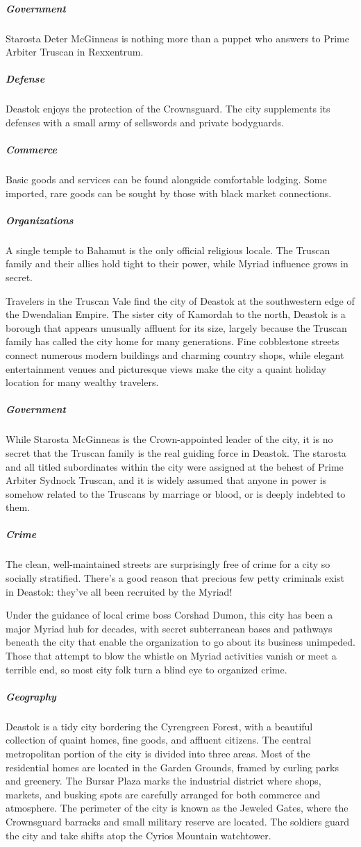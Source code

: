 \documentclass[10pt,a4paper,twoside,bg=print,twocolumn,openany,nodeprecatedcode]{dndbook}
\begin{document}
\subparagraph{Government}
Starosta Deter McGinneas is nothing more than a puppet who answers to Prime Arbiter Truscan in Rexxentrum.

\subparagraph{Defense}
Deastok enjoys the protection of the Crownsguard. The city supplements its defenses with a small army of sellswords and private bodyguards.

\subparagraph{Commerce}
Basic goods and services can be found alongside comfortable lodging. Some imported, rare goods can be sought by those with black market connections.

\subparagraph{Organizations}
A single temple to Bahamut is the only official religious locale. The Truscan family and their allies hold tight to their power, while Myriad influence grows in secret.

Travelers in the Truscan Vale find the city of Deastok at the southwestern edge of the Dwendalian Empire. The sister city of Kamordah to the north, Deastok is a borough that appears unusually affluent for its size, largely because the Truscan family has called the city home for many generations. Fine cobblestone streets connect numerous modern buildings and charming country shops, while elegant entertainment venues and picturesque views make the city a quaint holiday location for many wealthy travelers.

\subparagraph{Government}
While Starosta McGinneas is the Crown-appointed leader of the city, it is no secret that the Truscan family is the real guiding force in Deastok. The starosta and all titled subordinates within the city were assigned at the behest of Prime Arbiter Sydnock Truscan, and it is widely assumed that anyone in power is somehow related to the Truscans by marriage or blood, or is deeply indebted to them.

\subparagraph{Crime}
The clean, well-maintained streets are surprisingly free of crime for a city so socially stratified. There's a good reason that precious few petty criminals exist in Deastok: they've all been recruited by the Myriad!

Under the guidance of local crime boss Corshad Dumon, this city has been a major Myriad hub for decades, with secret subterranean bases and pathways beneath the city that enable the organization to go about its business unimpeded. Those that attempt to blow the whistle on Myriad activities vanish or meet a terrible end, so most city folk turn a blind eye to organized crime.

\subparagraph{Geography}
Deastok is a tidy city bordering the Cyrengreen Forest, with a beautiful collection of quaint homes, fine goods, and affluent citizens. The central metropolitan portion of the city is divided into three areas. Most of the residential homes are located in the Garden Grounds, framed by curling parks and greenery. The Bursar Plaza marks the industrial district where shops, markets, and busking spots are carefully arranged for both commerce and atmosphere. The perimeter of the city is known as the Jeweled Gates, where the Crownsguard barracks and small military reserve are located. The soldiers guard the city and take shifts atop the Cyrios Mountain watchtower.
\end{document}
